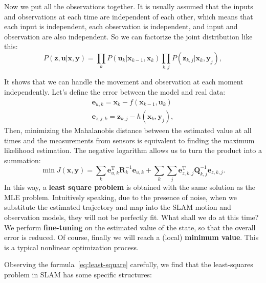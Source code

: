 Now we put all the observations together. It is usually assumed that the inputs and observations at each time are independent of each other, which means that each input is independent, each observation is independent, and input and observation are also independent. So we can factorize the joint distribution like this:
\begin{equation}
	P\left( {\mathbf{z},\mathbf{u}|\mathbf{x},\mathbf{y}} \right) = \prod\limits_k {P\left( {{\mathbf{u}_k }|{\mathbf{x}_{k-1}},{\mathbf{x}_k}} \right)} \prod\limits_{k,j} {P\left( {{\mathbf{z} _{k,j}}|{\mathbf{x}_k},{\mathbf{y}_j}} \right)},
\end{equation}

It shows that we can handle the movement and observation at each moment independently. Let's define the error between the model and real data: 
\begin{equation}
	\begin{array}{l}
		{\mathbf{e}_{u,k}} = {\mathbf{x}_k}-f\left( {{\mathbf{x}_{k-1}},{\mathbf{u}_k} } \right)\\
		{\mathbf{e}_{z,j,k}} = {\mathbf{z}_{k,j}}-h\left( {{\mathbf{x}_k},{\mathbf{y} _j}} \right),
	\end{array}
\end{equation}
Then, minimizing the Mahalanobis distance between the estimated value at all times and the measurements from sensors is equivalent to finding the maximum likelihood estimation. The negative logarithm allows us to turn the product into a summation:
\begin{equation}
	\label{eq:least-square}
	\min J (\mathbf{x},\mathbf{y}) = \sum\limits_k {\mathbf{e}_{u,k}^\mathrm{T} \mathbf{R}_k^{-1} {\mathbf{e}_{u,k}}} + \sum\limits_k {\sum\limits_j {\mathbf{e}_{z,k,j}^\mathrm{T} \mathbf{Q}_ {k,j}^{-1}{\mathbf{e}_{z,k,j}}}}.
\end{equation}
In this way, a \textbf{least square problem} is obtained with the same solution as the MLE problem. Intuitively speaking, due to the presence of noise, when we substitute the estimated trajectory and map into the SLAM motion and observation models, they will not be perfectly fit. What shall we do at this time? We perform \textbf{fine-tuning} on the estimated value of the state, so that the overall error is reduced. Of course, finally we will reach a (local) \textbf{minimum value}. This is a typical nonlinear optimization process.

Observing the formula~\eqref{eq:least-square} carefully, we find that the least-squares problem in SLAM has some specific structures:


